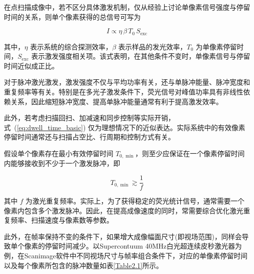 在点扫描成像中，若不区分具体激发机制，仅从经验上讨论单像素信号强度与停留时间的关系，则单个像素获得的总信号可写为

\begin{equation}
I \propto \eta \,\beta \,T_0\, S_{\mathrm{exc}}
\label{eq:signal_general}
\end{equation}

其中，$\eta$ 表示系统的综合探测效率，$\beta$ 表示样品的发光效率，$T_0$ 为单像素停留时间，$S_{\mathrm{exc}}$ 表示激发强度相关项。该式表明，在其他条件不变时，单像素信号与停留时间近似成正比。

对于脉冲激光激发，激发强度不仅与平均功率有关，还与单脉冲能量、脉冲宽度和重复频率等有关。特别是在多光子激发条件下，荧光信号对峰值功率具有非线性依赖关系，因此缩短脉冲宽度、提高单脉冲能量通常有利于提高激发效率。

此外，若考虑扫描回扫、加减速和同步控制等实际开销，式~(\ref{eq:dwell_time_basic}) 仅为理想情况下的近似表达。实际系统中的有效像素停留时间通常还与扫描占空比、行周期和控制方式有关。

假设单个像素存在最小有效停留时间 $T_{0,\min}$，则至少应保证在一个像素停留时间内能够接收到不少于一个激发脉冲，即

\begin{equation}
T_{0,\min}\gtrsim \frac{1}{f}
\label{eq:min_dwell_time}
\end{equation}

其中 $f$ 为激光重复频率。实际上，为了获得稳定的荧光统计信号，通常需要一个像素内包含多个激发脉冲。因此，在提高成像速度的同时，常需要综合优化激光重复频率、扫描速度与像素数等参数。

此外，在帧率保持不变的条件下，如果增大成像幅面尺寸(即视场范围)，同样会导致单个像素的停留时间减少。以Supercontuum 40MHz白光超连续皮秒激光器为例，在Scanimage软件中不同视场尺寸与帧率组合条件下，对应的单像素停留时间以及每个像素所包含的脉冲数量如表\ref{Table2.1}所示。

